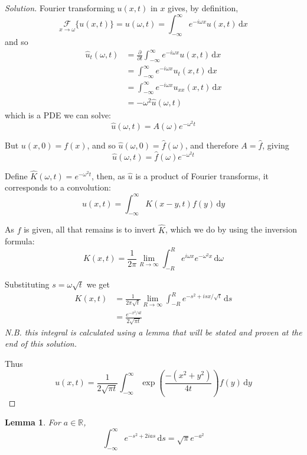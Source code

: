 \documentclass[10pt,fleqn]{article}
\newcommand{\diff}{\,\mathrm{d}}
\newcommand{\reals}{\mathbb{R}}
\theoremstyle{definition} \newtheorem{defn}{Definition}[section]
\theoremstyle{plain}      \newtheorem{thm}[defn]{Theorem}
\theoremstyle{plain}      \newtheorem{lem}[defn]{Lemma}
\theoremstyle{definition} \newtheorem{prop}[defn]{Proposition}
\theoremstyle{definition} \newtheorem{cor}[defn]{Corollary}
\theoremstyle{definition} \newtheorem{ex}[defn]{Example}
\theoremstyle{definition} \newtheorem{rem}[defn]{Remark}
\begin{document}
{\begin{proof}[Solution]
    Fourier transforming $u(x,t)$ in $x$ gives, by definition,
    \[
        \underset{x\to\omega}{\mathcal{F}}\{u(x,t)\}=
        u(\omega,t)=
        \int_{-\infty}^{\infty}e^{-i\omega x}u(x,t)\diff x
    \]
    and so
    \begin{align*}
        \hat{u}_t(\omega,t)
        &=
        \frac{\partial}{\partial t}\int_{-\infty}^{\infty}e^{-i\omega x}u(x,t)\diff x\\
        &=
        \int_{-\infty}^{\infty}e^{-i\omega x}u_t(x,t)\diff x\\
        &=
        \int_{-\infty}^{\infty}e^{-i\omega x}u_{xx}(x,t)\diff x\\
        &=
        -\omega^2\hat{u}(\omega,t)
    \end{align*}
    which is a PDE we can solve:
    \[
        \hat{u}(\omega,t)=A(\omega)e^{-\omega^2 t}
    \]

    But $u(x,0)=f(x)$, and so $\hat{u}(\omega,0)=\hat{f}(\omega)$, and therefore $A=\hat{f}$, giving
    \[
        \hat{u}(\omega,t)=\hat{f}(\omega)e^{-\omega^2 t}
    \]

    Define $\hat{K}(\omega,t)=e^{-\omega^2 t}$, then, as $\hat{u}$ is a product of Fourier transforms, it corresponds to a convolution:
    \[
        u(x,t)=
        \int_{-\infty}^{\infty}K(x-y,t)f(y)\diff y
    \]

    As $f$ is given, all that remains is to invert $\hat{K}$, which we do by using the inversion formula:
    \[
        K(x,t)=
        \frac{1}{2\pi}\lim_{R\to\infty}\int_{-R}^R e^{i\omega x}e^{-\omega^2 x}\diff\omega
    \]

    Substituting $s=\omega\sqrt{t}$ we get
    \begin{align*}
        K(x,t)
        &=
        \frac{1}{2\pi\sqrt{t}}\lim_{R\to\infty}\int_{-R}^R e^{-s^2+isx/\sqrt{t}}\diff s\\
        &=
        \frac{e^{-x^2/4t}}{2\sqrt{\pi t}}
    \end{align*}
    \emph{N.B. this integral is calculated using a lemma that will be stated and proven at the end of this solution.}

    Thus
    \[
        u(x,t)=
        \frac{1}{2\sqrt{\pi t}}\int_{-\infty}^{\infty}\exp{\left(\frac{-(x^2+y^2)}{4t}\right)}f(y)\diff y
    \]
\end{proof}

\begin{lem}
    For $a\in\reals$,
    \[
        \int_{-\infty}^{\infty}e^{-s^2+2ias}\diff s=
        \sqrt{\pi}e^{-a^2}
    \]
\end{lem}

}
\end{document}
